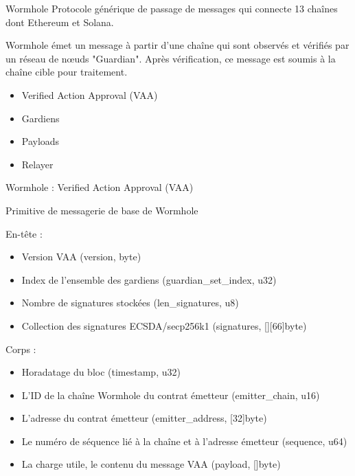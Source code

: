 \begin{frame}{Wormhole}
Protocole générique de passage de messages qui connecte 13 chaînes dont Ethereum et Solana.
\newline

Wormhole émet un message à partir d'une chaîne qui sont observés et vérifiés par un réseau de nœuds "Guardian". Après vérification, ce message est soumis à la chaîne cible pour traitement.
\newline 

\begin{itemize}
    \item Verified Action Approval (VAA)
    \item Gardiens
    \item Payloads
    \item Relayer
\end{itemize}
\end{frame}

\begin{frame}{Wormhole : Verified Action Approval (VAA)}

Primitive de messagerie de base de Wormhole
\newline

En-tête :
\begin{itemize}
    \item Version VAA (version, byte)
    \item Index de l'ensemble des gardiens (guardian\_set\_index, u32)
    \item Nombre de signatures stockées (len\_signatures, u8)
    \item Collection des signatures ECSDA/secp256k1 (signatures, [][66]byte)
\end{itemize}

Corps : 
\begin{itemize}
    \item Horadatage du bloc (timestamp, u32)
    \item L'ID de la chaîne Wormhole du contrat émetteur (emitter\_chain, u16)
    \item L'adresse du contrat émetteur (emitter\_address, [32]byte)
    \item Le numéro de séquence lié à la chaîne et à l'adresse émetteur (sequence, u64)
    \item La charge utile, le contenu du message VAA (payload, []byte)
\end{itemize}
\end{frame}

